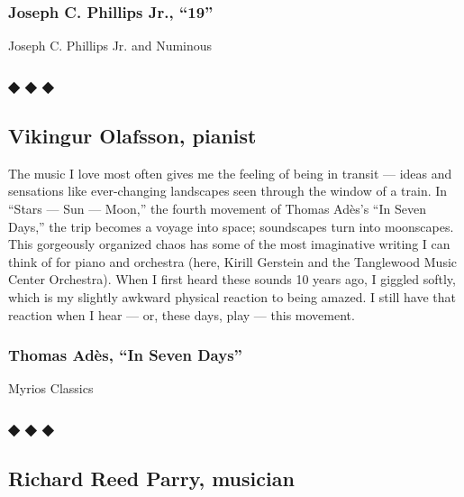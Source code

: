 \hypertarget{joseph-c-phillips-jr-19}{%
\subsubsection{Joseph C. Phillips Jr.,
``19''}\label{joseph-c-phillips-jr-19}}

Joseph C. Phillips Jr. and Numinous

\hypertarget{---5}{%
\subsubsection{◆ ◆ ◆}\label{---5}}

\hypertarget{vikingur-olafsson-pianist}{%
\subsection{Vikingur Olafsson,
pianist}\label{vikingur-olafsson-pianist}}

The music I love most often gives me the feeling of being in transit ---
ideas and sensations like ever-changing landscapes seen through the
window of a train. In ``Stars --- Sun --- Moon,'' the fourth movement of
Thomas Adès's ``In Seven Days,'' the trip becomes a voyage into space;
soundscapes turn into moonscapes. This gorgeously organized chaos has
some of the most imaginative writing I can think of for piano and
orchestra (here, Kirill Gerstein and the Tanglewood Music Center
Orchestra). When I first heard these sounds 10 years ago, I giggled
softly, which is my slightly awkward physical reaction to being amazed.
I still have that reaction when I hear --- or, these days, play --- this
movement.

\hypertarget{thomas-aduxe8s-in-seven-days}{%
\subsubsection{Thomas Adès, ``In Seven
Days''}\label{thomas-aduxe8s-in-seven-days}}

Myrios Classics

\hypertarget{---6}{%
\subsubsection{◆ ◆ ◆}\label{---6}}

\hypertarget{richard-reed-parry-musician}{%
\subsection{Richard Reed Parry,
musician}\label{richard-reed-parry-musician}}

